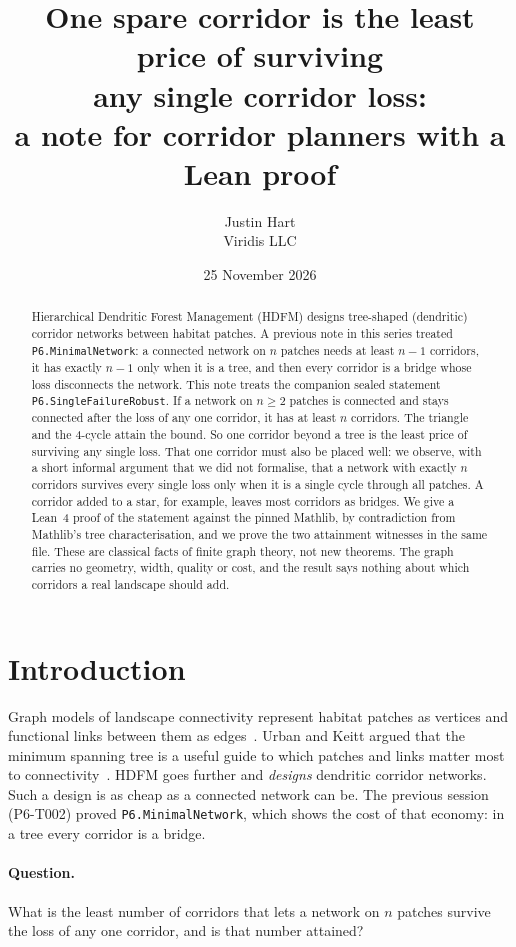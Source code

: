 \documentclass[11pt]{article}
\title{One spare corridor is the least price of surviving\\ any single corridor loss:\\ a note for corridor planners with a Lean proof}
\author{Justin Hart\\Viridis LLC}
\date{25 November 2026}
\begin{document}
\maketitle

\begin{abstract}
Hierarchical Dendritic Forest Management (HDFM) designs tree-shaped (dendritic) corridor networks
between habitat patches. A previous note in this series treated \texttt{P6.MinimalNetwork}: a connected
network on $n$ patches needs at least $n-1$ corridors, it has exactly $n-1$ only when it is a tree, and
then every corridor is a bridge whose loss disconnects the network. This note treats the companion sealed
statement \texttt{P6.SingleFailureRobust}. If a network on $n\ge 2$ patches is connected and stays
connected after the loss of any one corridor, it has at least $n$ corridors. The triangle and the
4-cycle attain the bound. So one corridor beyond a tree is the least price of surviving any single loss.
That one corridor must also be placed well: we observe, with a short informal argument that we did not
formalise, that a network with exactly $n$ corridors survives every single loss only when it is a single
cycle through all patches. A corridor added to a star, for example, leaves most corridors as bridges. We give a Lean~4
proof of the statement against the pinned Mathlib, by contradiction from Mathlib's tree
characterisation, and we prove the two attainment witnesses in the same file. These are classical facts
of finite graph theory, not new theorems. The graph carries no geometry, width, quality or cost, and the
result says nothing about which corridors a real landscape should add.
\end{abstract}

\section{Introduction}
Graph models of landscape connectivity represent habitat patches as vertices and functional
links between them as edges~\citep{urbankeitt2001}. Urban and Keitt argued that the minimum spanning
tree is a useful guide to which patches and links matter most to connectivity~\citep{urbankeitt2001}.
HDFM goes further and \emph{designs} dendritic corridor networks. Such a design is as cheap as a
connected network can be. The previous session (P6-T002) proved \texttt{P6.MinimalNetwork}, which shows
the cost of that economy: in a tree every corridor is a bridge.

\paragraph{Question.} What is the least number of corridors that lets a network on $n$ patches survive
the loss of any one corridor, and is that number attained?
\end{document}
